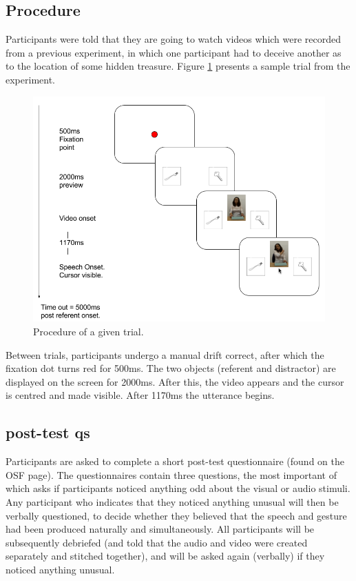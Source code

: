 \documentclass[a4paper,man,natbib]{apa6}
\begin{document}
\subsection{Procedure}
Participants were told that they are going to watch videos which were recorded from a previous experiment, in which one participant had to deceive another as to the location of some hidden treasure. 
Figure \ref{fig:v2trial} presents a sample trial from the experiment. 
\begin{figure}[Ht]
  \centering
	\includegraphics[width=\linewidth]{gcdv2.png}
  \caption{Procedure of a given trial.}
  \label{fig:v2trial}
\end{figure}
Between trials, participants undergo a manual drift correct, after which the fixation dot turns red for 500ms. 
The two objects (referent and distractor) are displayed on the screen for 2000ms.
After this, the video appears and the cursor is centred and made visible. 
After 1170ms the utterance begins. 

\subsection{post-test qs}
Participants are asked to complete a short post-test questionnaire (found on the OSF page). 
The questionnaires contain three questions, the most important of which asks if participants noticed anything odd about the visual or audio stimuli.
Any participant who indicates that they noticed anything unusual will then be verbally questioned, to decide whether they believed that the speech and gesture had been produced naturally and simultaneously.
All participants will be subsequently debriefed (and told that the audio and video were created separately and stitched together), and will be asked again (verbally) if they noticed anything unusual. 
\end{document}
